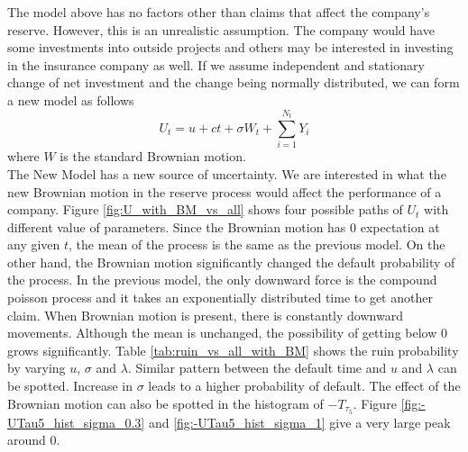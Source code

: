 \documentclass[a4paper,11pt]{article}
\begin{document}
The model above has no factors other than claims that affect the company's reserve. However, this is an unrealistic assumption. The company would have some investments into outside projects and others may be interested in investing in the insurance company as well.  If we assume independent and stationary change of net investment and the change being normally distributed, we can form a new model as follows
\begin{equation}
	U_t = u + ct + \sigma W_t + \sum_{i=1}^{N_t}Y_i
	\label{eq:U_t_BM}
\end{equation}
where $W$ is the standard Brownian motion.\\

The New Model has a new source of uncertainty. We are interested in what the new Brownian motion in the reserve process would affect the performance of a company. Figure \ref{fig:U_with_BM_vs_all} shows four possible paths of $U_t$ with different value of parameters. Since the Brownian motion has 0 expectation at any given $t$, the mean of the process is the same as the previous model. On the other hand, the Brownian motion significantly changed the default probability of the process. In the previous model, the only downward force is the compound poisson process and it takes an exponentially distributed time to get another claim. When Brownian motion is present, there is constantly downward movements. Although the mean is unchanged, the possibility of getting below 0 grows significantly. Table \ref{tab:ruin_vs_all_with_BM} shows the ruin probability by varying $u$, $\sigma$ and $\lambda$. Similar pattern between the default time and $u$ and $\lambda$ can be spotted. Increase in $\sigma$ leads to a higher probability of default. The effect of the Brownian motion can also be spotted in the histogram of $-T_{\tau_5}$. Figure \ref{fig:-UTau5_hist_sigma_0.3} and \ref{fig:-UTau5_hist_sigma_1} give a very large peak around 0.\\
\end{document}
